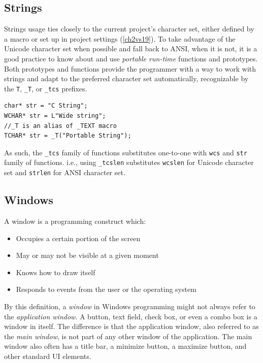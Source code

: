 \subsection{Strings}
Strings usage ties closely to the current project's character set, either defined by a macro or set up in project settings (\ref{ch2vs19}). To take advantage of the Unicode character set when possible and fall back to ANSI, when it is not, it is a good practice to know about and use \textit{portable run-time} functions and prototypes. Both prototypes and functions provide the programmer with a way to work with strings and adapt to the preferred character set automatically, recognizable by the \lstinline{T}, \lstinline{_T}, or \lstinline{_tcs} prefixes.

\begin{lstlisting}[caption={An example of defining static strings}]
char* str = "C String";
WCHAR* str = L"Wide string";
//_T is an alias of _TEXT macro
TCHAR* str = _T("Portable String");
\end{lstlisting}
As such, the \lstinline{_tcs} family of functions substitutes one-to-one with \lstinline{wcs} and \lstinline{str} family of functions. i.e., using \lstinline{_tcslen} substitutes \lstinline{wcslen} for Unicode character set and \lstinline{strlen} for ANSI character set.\cite{WinUnicodeSummary}

\subsection{Windows}
\label{ch2Windows}
A window is a programming construct which:
\begin{itemize}
    \item Occupies a certain portion of the screen
    \item May or may not be visible at a given moment
    \item Knows how to draw itself
    \item Responds to events from the user or the operating system
\end{itemize}

By this definition, a \textit{window} in Windows programming might not always refer to the \textit{application window}. A button, text field, check box, or even a combo box is a window in itself. The difference is that the application window, also referred to as the \textit{main window}, is not part of any other window of the application. The main window also often has a title bar, a minimize button, a maximize button, and other standard UI elements.

